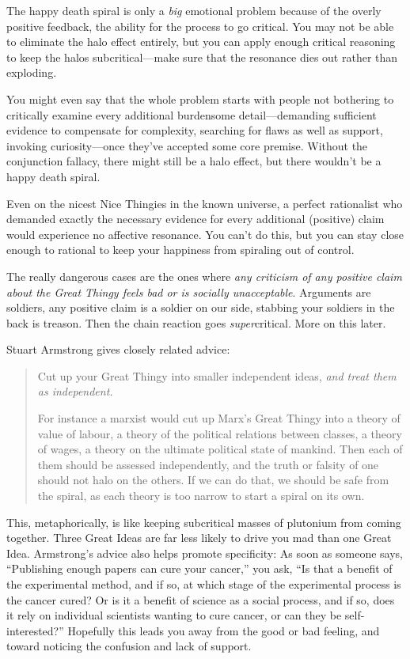 {
 The happy death spiral is only a \textit{big} emotional problem
because of the overly positive feedback, the ability for the process to
go critical. You may not be able to eliminate the halo effect entirely,
but you can apply enough critical reasoning to keep the halos
subcritical---make sure that the resonance dies out rather than
exploding.}

{
 You might even say that the whole problem starts with people not
bothering to critically examine every additional burdensome
detail---demanding sufficient evidence to compensate for complexity,
searching for flaws as well as support, invoking curiosity---once
they've accepted some core premise. Without the
conjunction fallacy, there might still be a halo effect, but there
wouldn't be a happy death spiral.}

{
 Even on the nicest Nice Thingies in the known universe, a perfect
rationalist who demanded exactly the necessary evidence for every
additional (positive) claim would experience no affective resonance.
You can't do this, but you can stay close enough to
rational to keep your happiness from spiraling out of control.}

{
 The really dangerous cases are the ones where \textit{any
criticism of any positive claim about the Great Thingy feels bad or is
socially unacceptable}. Arguments are soldiers, any positive claim is a
soldier on our side, stabbing your soldiers in the back is treason.
Then the chain reaction goes \textit{super}critical. More on this
later.}

{
 Stuart Armstrong gives closely related advice:}

\begin{quotation}
{
 Cut up your Great Thingy into smaller independent ideas,
\textit{and treat them as independent.}}

{
 For instance a marxist would cut up Marx's Great
Thingy into a theory of value of labour, a theory of the political
relations between classes, a theory of wages, a theory on the ultimate
political state of mankind. Then each of them should be assessed
independently, and the truth or falsity of one should not halo on the
others. If we can do that, we should be safe from the spiral, as each
theory is too narrow to start a spiral on its own.}
\end{quotation}

{
 This, metaphorically, is like keeping subcritical masses of
plutonium from coming together. Three Great Ideas are far less likely
to drive you mad than one Great Idea. Armstrong's
advice also helps promote specificity: As soon as someone says,
``Publishing enough papers can cure your
cancer,'' you ask, ``Is that a
benefit of the experimental method, and if so, at which stage of the
experimental process is the cancer cured? Or is it a benefit of science
as a social process, and if so, does it rely on individual scientists
wanting to cure cancer, or can they be
self-interested?'' Hopefully this leads you away from
the good or bad feeling, and toward noticing the confusion and lack of
support.}

